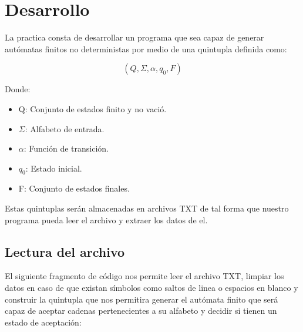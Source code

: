 \section{Desarrollo}

La practica consta de desarrollar un programa que sea capaz de generar autómatas finitos no deterministas por medio de una quintupla definida como:

\begin{equation}
(Q, \Sigma, \alpha, q_{0}, F)
\end{equation}

Donde:

\begin{itemize}
\item Q: Conjunto de estados finito y no vació.
\item $\Sigma$: Alfabeto de entrada.
\item $\alpha$: Función de transición.
\item $q_{0}$: Estado inicial.
\item F: Conjunto de estados finales. 
\end{itemize}

Estas quintuplas serán almacenadas en archivos TXT de tal forma que nuestro programa pueda leer el archivo y extraer los datos de el.

\subsection{Lectura del archivo}

El siguiente fragmento de código nos permite leer el archivo TXT, limpiar los datos en caso de que existan símbolos como saltos de linea o espacios en blanco y construir la quintupla que nos permitira generar el autómata finito que será capaz de aceptar cadenas pertenecientes a su alfabeto y decidir si tienen un estado de aceptación:

